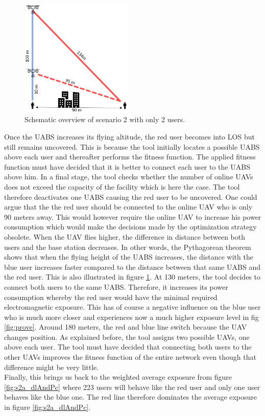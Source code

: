\begin{figure}
  \begin{center}
    \includegraphics[width=0.48\textwidth]{../results/s2/proveScenario.png}
  \end{center}
  \caption{Schematic overview of scenario 2 with only 2 users.}
  \label{fig:schematicprove}
\end{figure}
Once the \gls{UABS} increases its flying altitude, the red user becomes into \gls{LOS} but still remains uncovered. This is because the tool initially locates a possible 
\gls{UABS} above each user and thereafter performs the  fitness function. The applied fitness function must have decided that it is better to connect 
each user to the \gls{UABS} above him. In a final stage, the tool checks whether the number of online \gls{UAV}s does not exceed the capacity of the facility
which is here the case. The tool therefore deactivates one \gls{UABS} causing the red user to be uncovered. One could argue that the 
the red user should be connected to the online \gls{UAV} who is only 90 meters away. This would however require the online \gls{UAV} to increase his power consumption which 
would make the decisions made by the optimization strategy obsolete.
When the \gls{UAV} flies higher, the difference in distance between both users and the base station decreases. In other words, the Pythagorean theorem shows that when the flying height of the 
\gls{UABS} increases, the distance with the blue user increases faster compared to the distance between that same \gls{UABS} and the red user. This is also illustrated in 
figure \ref{fig:schematicprove}.
At 130 meters, the tool decides to connect both users to the same \gls{UABS}. Therefore, it increases its power consumption whereby the red user would  have the minimal 
required electromagnetic exposure. This has of course a negative influence on the blue user who is much more closer and experiences now a much higher exposure level in fig \ref{fig:prove}.
Around 180 meters, the  red and blue line switch because the \gls{UAV} changes position. As explained before, the tool assigns two possible \gls{UAV}s, one above 
each user. The tool must have decided that connecting both users to the other \gls{UAV}s improves the fitness function of the entire network even though that difference might be 
very little. \\
Finally, this brings us back to the weighted average exposure from figure \ref{fig:s2a_dlAndPc} where 223 users will behave like the  red user and only
one user behaves like the blue one. 
The red line therefore dominates the average exposure in figure \ref{fig:s2a_dlAndPc}.

